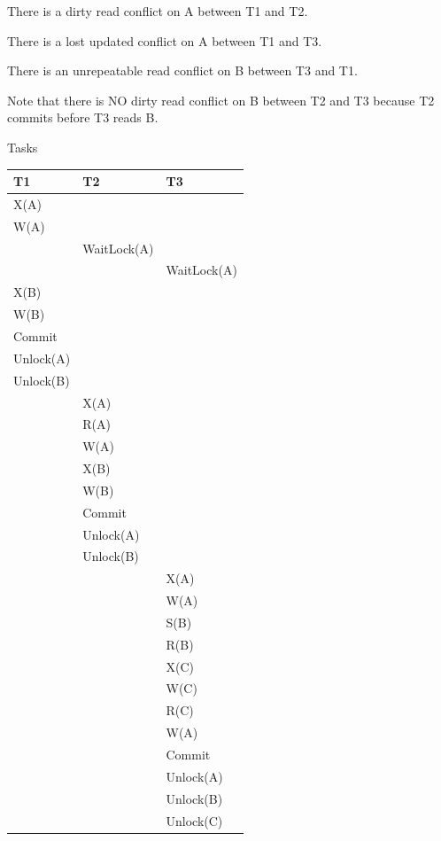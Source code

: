 \documentclass{beamer}
\begin{document}
\begin{slide}{
	\item There is a dirty read conflict on A between T1 and T2.
	\item There is a lost updated conflict on A between T1 and T3.
	\item There is an unrepeatable read conflict on B between T3 and T1.
	\item Note that there is NO dirty read conflict on B between T2 and T3 because T2 commits before T3 reads B.
}\end{slide}

\begin{frame}[fragile]{Tasks}
	\begin{table}
		\tiny
		\begin{tabular}{l|l|l}
			T1 & T2 & T3\\
			\hline
			X(A) & & \\
			W(A) & & \\
			& WaitLock(A) &\\
			& & WaitLock(A) \\
			X(B) & & \\
			W(B) & & \\
			Commit & & \\
			Unlock(A) & & \\
			Unlock(B) & & \\
			& X(A) & \\
			& R(A) & \\
			& W(A) & \\
			& X(B) & \\
			& W(B) & \\
			& Commit & \\
			& Unlock(A) & \\
			& Unlock(B) & \\
			& & X(A) \\
			& & W(A) \\
			& & S(B) \\
			& & R(B) \\
			& & X(C) \\
			& & W(C) \\
			& & R(C) \\
			& & W(A) \\
			& & Commit\\
			& & Unlock(A) \\
			& & Unlock(B) \\
			& & Unlock(C) \\	
		\end{tabular}
	\end{table}	
\end{frame}	
	
\end{document}
